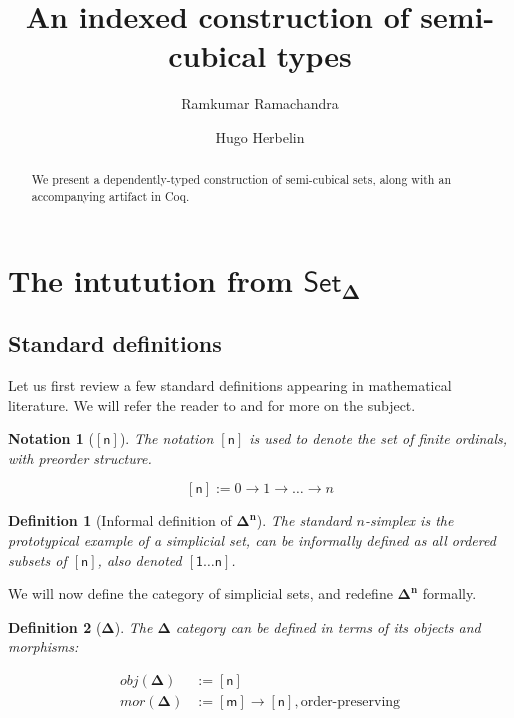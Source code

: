 \documentclass[10pt]{amsart}
\title{An indexed construction of semi-cubical types}
\author{Ramkumar Ramachandra}
\author{Hugo Herbelin}
\newtheorem{notation}{Notation}
\newtheorem{definition}{Definition}
\newcommand{\BDelta}{\ensuremath{\boldsymbol{\Delta}}}
\newcommand{\Simplex}{\ensuremath{\boldsymbol{\Delta^n}}}
\newcommand{\SSet}{\ensuremath{\mathsf{Set}_{\boldsymbol{\Delta}}}}
\newcommand{\sq}[1]{\ensuremath{\mathsf{[#1]}}}
\newcommand{\sqsn}{\ensuremath{\mathsf{[1 \ldots n]}}}
\begin{document}
\begin{abstract}
  We present a dependently-typed construction of semi-cubical sets, along with an accompanying artifact in Coq.
\end{abstract}
\maketitle
\tableofcontents

\section{The intutution from \texorpdfstring{\SSet}{simplicial sets}}
\subsection{Standard definitions}

Let us first review a few standard definitions appearing in mathematical literature. We will refer the reader to \cite{Friedman08} and \cite{Riehl11} for more on the subject.

\begin{notation}[\sq{n}]
  The notation \sq{n} is used to denote the set of finite ordinals, with preorder structure.

  \begin{equation*}
    \sq{n} := 0 \rightarrow 1 \rightarrow \ldots \rightarrow n
  \end{equation*}
\end{notation}

\begin{definition}[Informal definition of \Simplex]
  The standard $n$-simplex is the prototypical example of a simplicial set,  can be informally defined as all ordered subsets of \sq{n}, also denoted \sqsn.
\end{definition}

We will now define the category of simplicial sets, and redefine $\Simplex$ formally.

\begin{definition}[\BDelta]
  The $\BDelta$ category can be defined in terms of its objects and morphisms:

  \begin{align*}
    obj(\BDelta) & := \sq{n}                                             \\
    mor(\BDelta) & := \sq{m} \rightarrow \sq{n}, \text{order-preserving}
  \end{align*}
\end{definition}
\end{document}
